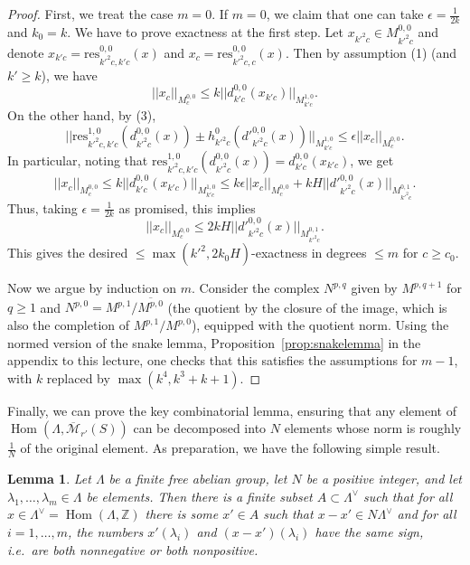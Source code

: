 \documentclass[11pt]{amsbook}
\DeclareMathOperator{\Hom}{Hom}
\numberwithin{equation}{section}
\numberwithin{theorem}{section}
\newtheorem{lemma}[theorem]{Lemma}
\theoremstyle{definition}
\begin{document}
\begin{proof} First, we treat the case $m=0$. If $m=0$, we claim that one can take $\epsilon=\tfrac 1{2k}$ and $k_0=k$. We have to prove exactness at the first step. Let $x_{k'^2c}\in M^{0,0}_{k'^2c}$ and denote $x_{k'c}=\mathrm{res}_{k'^2c,k'c}^{0,0}(x)$ and $x_c=\mathrm{res}_{k'^2c,c}^{0,0}(x)$. Then by assumption (1) (and $k'\geq k$), we have
\[
||x_c||_{M^{0,0}_c}\leq k||d^{0,0}_{k'c}(x_{k'c})||_{M^{1,0}_{k'c}}.
\]
On the other hand, by (3),
\[
||\mathrm{res}_{k'^2c,k'c}^{1,0}(d^{0,0}_{k'^2c}(x))\pm h^0_{k'^2c}(d'^{0,0}_{k'^2c}(x))||_{M^{1,0}_{k'c}}\leq \epsilon ||x_c||_{M^{0,0}_c}.
\]
In particular, noting that $\mathrm{res}_{k'^2c,k'c}^{1,0}(d^{0,0}_{k'^2c}(x)) = d^{0,0}_{k'c}(x_{k'c})$, we get
\[
||x_c||_{M^{0,0}_c}\leq k||d^{0,0}_{k'c}(x_{k'c})||_{M^{1,0}_{k'c}}\leq k\epsilon ||x_c||_{M^{0,0}_c} + kH ||d'^{0,0}_{k'^2c}(x)||_{M^{0,1}_{k'^2c}}.
\]
Thus, taking $\epsilon=\tfrac 1{2k}$ as promised, this implies
\[
||x_c||_{M^{0,0}_c}\leq 2kH ||d'^{0,0}_{k'^2c}(x)||_{M^{0,1}_{k'^2c}}.
\]
This gives the desired $\leq \max(k'^2,2k_0H)$-exactness in degrees $\leq m$ for $c\geq c_0$.

Now we argue by induction on $m$. Consider the complex $N^{p,q}$ given by $M^{p,q+1}$ for $q\geq 1$ and $N^{p,0} = M^{p,1}/\overline{M^{p,0}}$ (the quotient by the closure of the image, which is also the completion of $M^{p,1}/M^{p,0}$), equipped with the quotient norm. Using the normed version of the snake lemma, Proposition~\ref{prop:snakelemma} in the appendix to this lecture, one checks that this satisfies the assumptions for $m-1$, with $k$ replaced by $\max(k^4,k^3+k+1)$.
\end{proof}

Finally, we can prove the key combinatorial lemma, ensuring that any element of $\Hom(\Lambda,\overline{\mathcal M}_{r'}(S))$ can be decomposed into $N$ elements whose norm is roughly $\tfrac 1N$ of the original element. As preparation, we have the following simple result.

\begin{lemma} Let $\Lambda$ be a finite free abelian group, let $N$ be a positive integer, and let $\lambda_1,\ldots,\lambda_m\in \Lambda$ be elements. Then there is a finite subset $A\subset \Lambda^\vee$ such that for all $x\in \Lambda^\vee=\Hom(\Lambda,\mathbb Z)$ there is some $x'\in A$ such that $x-x'\in N\Lambda^\vee$ and for all $i=1,\ldots,m$, the numbers $x'(\lambda_i)$ and $(x-x')(\lambda_i)$ have the same sign, i.e.~are both nonnegative or both nonpositive.
\end{lemma}
\end{document}
